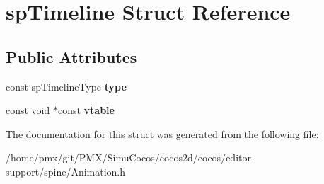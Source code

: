 \hypertarget{structspTimeline}{}\section{sp\+Timeline Struct Reference}
\label{structspTimeline}
\subsection*{Public Attributes}
\begin{DoxyCompactItemize}
\item 
\mbox{\label{structspTimeline_a9b7ced82c6b0ff40b3774dc305c881a8}} 
const sp\+Timeline\+Type {\bfseries type}
\item 
\mbox{\label{structspTimeline_aebc7743219b27fdb7096b4cfb88a1b0d}} 
const void $\ast$const {\bfseries vtable}
\end{DoxyCompactItemize}


The documentation for this struct was generated from the following file\+:\begin{DoxyCompactItemize}
\item 
/home/pmx/git/\+P\+M\+X/\+Simu\+Cocos/cocos2d/cocos/editor-\/support/spine/Animation.\+h\end{DoxyCompactItemize}
